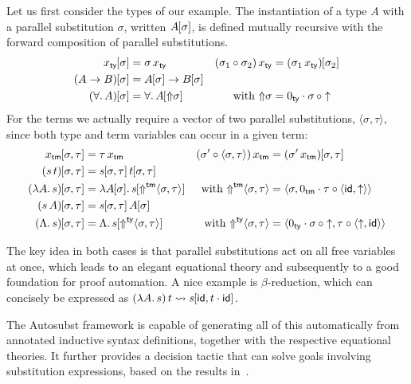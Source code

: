 \documentclass[a4paper,UKenglish]{lipics-v2016}
\newcommand{\ty}{\mathsf{ty}}
\newcommand{\tm}{\mathsf{tm}}
\newcommand{\All}{\ensuremath{\forall.\,}}
\newcommand{\Lam}[1]{\ensuremath{\lambda #1.\,}}
\newcommand{\TyLam}{\ensuremath{\Lambda.\,}}
\newcommand{\subst}[1]{\hphantom{|}\!\![{#1}]}
\newcommand{\scons}{\mathbin{\cdot}}
\newcommand{\scomp}{\mathbin{\circ}}
\newcommand{\id}{\mathsf{id}}
\newcommand{\up}{{\Uparrow}}
\newcommand{\shift}{\ensuremath{\uparrow}}
\theoremstyle{plain}
\begin{document}
Let us first consider the types of our example.
The instantiation of a type $A$ with a parallel substitution $\sigma$, written $A\subst\sigma$, is defined mutually recursive with the forward composition of parallel substitutions.
\begin{align*}
  x_\ty\subst\sigma &= \sigma\,x_\ty & (\sigma_1 \scomp \sigma_2)\,x_\ty &= (\sigma_1\,x_\ty)\subst{\sigma_2}\\
  (A\to B)\subst\sigma &= A\subst\sigma \to B\subst\sigma & &\\
  (\All A)\subst\sigma &= \All A\subst{\up\sigma} & \text{with } \up\sigma&= 0_\ty \scons \sigma\,\scomp \shift
\end{align*}
For the terms we actually require a vector of two parallel substitutions, $\langle\sigma,\tau\rangle$, since both type and term variables can occur in a given term:
\begin{align*}
  x_\tm\subst{\sigma,\tau} &= \tau\,x_\tm & (\sigma' \scomp \langle\sigma,\tau\rangle)\,x_\tm &= (\sigma'\,x_\tm)\subst{\sigma,\tau}\\
  (s\,t)\subst{\sigma,\tau} &= s\subst{\sigma,\tau}\,t\subst{\sigma,\tau} & &\\
  (\Lam A s)\subst{\sigma,\tau} &= \Lam {A\subst\sigma} {s\subst{\up^{\tm}\langle\sigma,\tau\rangle}} & \text{with } \up^{\tm}\langle\sigma,\tau\rangle &= \langle\sigma,0_\tm\scons\tau\scomp{\langle\id,\shift\rangle}\rangle\\
  (s\,A)\subst{\sigma,\tau} &= s\subst{\sigma,\tau}\,A\subst{\sigma} & &\\
  (\TyLam s)\subst{\sigma,\tau} &= \TyLam {s\subst{\up^{\ty}\langle\sigma,\tau\rangle}} & \text{with } \up^{\ty}\langle\sigma,\tau\rangle&= \langle 0_\ty \scons \sigma\, \scomp \shift, \tau \scomp \langle\shift,\id\rangle\rangle
\end{align*}

The key idea in both cases is that parallel substitutions act on all free variables at once, which leads to an elegant equational theory and subsequently to a good foundation for proof automation.
A nice example is $\beta$-reduction, which can concisely be expressed as $(\Lam A s)\,t\leadsto s\subst{\id,t\scons\id}$.

The Autosubst framework is capable of generating all of this automatically from annotated inductive syntax definitions, together with the respective equational theories.
It further provides a decision tactic that can solve goals involving substitution expressions, based on the results in~\cite{SchaeferEtAl:2009:Completeness}.
\end{document}
